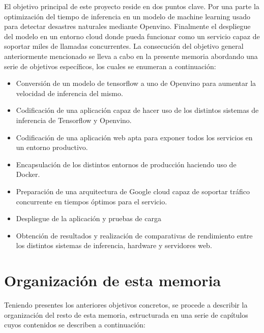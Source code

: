 El objetivo principal de este proyecto reside en dos puntos clave.
Por una parte la optimización del tiempo de inferencia en un modelo de machine learning usado para detectar desastres naturales mediante Openvino.
Finalmente el despliegue del modelo en un entorno cloud donde pueda funcionar como un servicio capaz de soportar miles de llamadas concurrentes.
La consecución del objetivo general anteriormente mencionado se lleva a cabo en la
presente memoria abordando una serie de objetivos específicos, los cuales se enumeran a
continuación:
\begin{itemize}
    \item Conversión de un modelo de tensorflow a uno de Openvino para aumentar la velocidad de inferencia del mismo.
    \item Codificación de una aplicación capaz de hacer uso de los distintos sistemas de inferencia de Tensorflow y Openvino.
    \item Codificación de una aplicación web apta para exponer todos los servicios en un entorno productivo.
    \item Encapsulación de los distintos entornos de producción haciendo uso de Docker.
    \item Preparación de una arquitectura de Google cloud capaz de soportar tráfico concurrente en tiempos óptimos para el servicio.
    \item Despliegue de la aplicación y pruebas de carga
    \item Obtención de resultados y realización de comparativas de rendimiento entre los distintos sistemas de inferencia, hardware y servidores web.
\end{itemize}


\section{Organización de esta memoria}

Teniendo presentes los anteriores objetivos concretos, se procede a describir la organización del resto de esta memoria, estructurada en una serie de capítulos cuyos contenidos se
describen a continuación:

